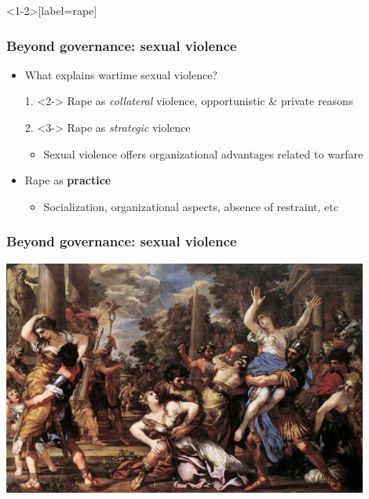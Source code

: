 \documentclass[aspectratio=43]{beamer}
\begin{document}
\begin{frame}<1-2>[label=rape]
\frametitle{Beyond governance: sexual violence}
\centering

\begin{itemize}
  \item<1-> What explains wartime sexual violence?
  \item[]
  \item[1.]<2-> Rape as \textit{collateral} violence, opportunistic \& private reasons
  \item[2.]<3-> Rape as \textit{strategic} violence
  \begin{itemize}
    \item Sexual violence offers organizational advantages related to warfare
  \end{itemize}
  \item<4-> Rape as \textbf{practice}
  \begin{itemize}
    \item Socialization, organizational aspects, absence of restraint, etc
  \end{itemize}
\end{itemize}

\end{frame}

\begin{frame}
\frametitle{Beyond governance: sexual violence}
\centering

\includegraphics[width = 0.9\textwidth]{img/rape_history}

\end{frame}
\end{document}
